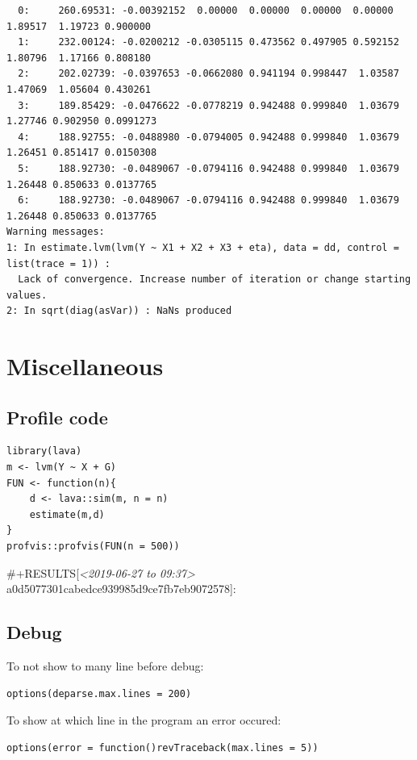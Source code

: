 \documentclass{article}
\begin{document}
\begin{verbatim}
  0:     260.69531: -0.00392152  0.00000  0.00000  0.00000  0.00000  1.89517  1.19723 0.900000
  1:     232.00124: -0.0200212 -0.0305115 0.473562 0.497905 0.592152  1.80796  1.17166 0.808180
  2:     202.02739: -0.0397653 -0.0662080 0.941194 0.998447  1.03587  1.47069  1.05604 0.430261
  3:     189.85429: -0.0476622 -0.0778219 0.942488 0.999840  1.03679  1.27746 0.902950 0.0991273
  4:     188.92755: -0.0488980 -0.0794005 0.942488 0.999840  1.03679  1.26451 0.851417 0.0150308
  5:     188.92730: -0.0489067 -0.0794116 0.942488 0.999840  1.03679  1.26448 0.850633 0.0137765
  6:     188.92730: -0.0489067 -0.0794116 0.942488 0.999840  1.03679  1.26448 0.850633 0.0137765
Warning messages:
1: In estimate.lvm(lvm(Y ~ X1 + X2 + X3 + eta), data = dd, control = list(trace = 1)) :
  Lack of convergence. Increase number of iteration or change starting values.
2: In sqrt(diag(asVar)) : NaNs produced
\end{verbatim}

\section{Miscellaneous}
\label{sec:org0cb409d}
\subsection{Profile code}
\label{sec:org8ae344d}

\lstset{language=r,label= ,caption= ,captionpos=b,numbers=none}
\begin{lstlisting}
library(lava)
m <- lvm(Y ~ X + G)
FUN <- function(n){
	d <- lava::sim(m, n = n)
	estimate(m,d)
}
profvis::profvis(FUN(n = 500))
\end{lstlisting}

\#+RESULTS[\textit{<2019-06-27 to 09:37> } a0d5077301cabedce939985d9ce7fb7eb9072578]:
\subsection{Debug}
\label{sec:org73c62d6}
To not show to many line before debug:
\lstset{language=r,label= ,caption= ,captionpos=b,numbers=none}
\begin{lstlisting}
options(deparse.max.lines = 200)
\end{lstlisting}

To show at which line in the program an error occured:
\lstset{language=r,label= ,caption= ,captionpos=b,numbers=none}
\begin{lstlisting}
options(error = function()revTraceback(max.lines = 5))
\end{lstlisting}
\end{document}
